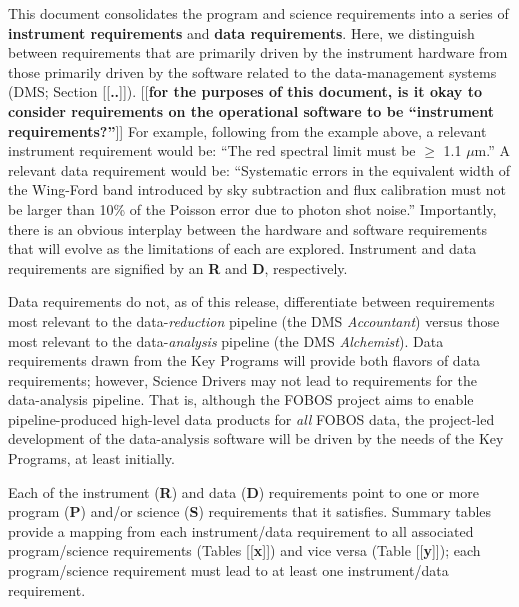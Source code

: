 \documentclass[11pt,a4paper,twoside,onecolumn,openany,final,oldfontcommands]{memoir}
\newcommand{\edit}[2][todo]{{\color{#1}[[{\bf #2}]]}}
\begin{document}
This document consolidates the program and science requirements into a series of {\bf instrument requirements} and {\bf data requirements}.  Here, we distinguish between requirements that are primarily driven by the instrument hardware from those primarily driven by the software related to the data-management systems (DMS; Section \edit{..}).  \edit{for the purposes of this document, is it okay to consider requirements on the operational software to be ``instrument requirements?''}  For example, following from the example above, a relevant instrument requirement would be: ``The red spectral limit must be $\geq$ 1.1 $\mu$m.''  A relevant data requirement would be: ``Systematic errors in the equivalent width of the Wing-Ford band introduced by sky subtraction and flux calibration must not be larger than 10\% of the Poisson error due to photon shot noise.''  Importantly, there is an obvious interplay between the hardware and software requirements that will evolve as the limitations of each are explored. Instrument and data requirements are signified by an {\bf R} and {\bf D}, respectively.

Data requirements do not, as of this release, differentiate between requirements most relevant to the data-{\it reduction} pipeline (the DMS {\it Accountant}) versus those most relevant to the data-{\it analysis} pipeline (the DMS {\it Alchemist}).  Data requirements drawn from the Key Programs will provide both flavors of data requirements; however, Science Drivers may not lead to requirements for the data-analysis pipeline.  That is, although the FOBOS project aims to enable pipeline-produced high-level data products for {\it all} FOBOS data, the project-led development of the data-analysis software will be driven by the needs of the Key Programs, at least initially.

Each of the instrument ({\bf R}) and data ({\bf D}) requirements point to one or more program ({\bf P}) and/or science ({\bf S}) requirements that it satisfies.  Summary tables provide a mapping from each instrument/data requirement to all associated program/science requirements (Tables \edit{x}) and vice versa (Table \edit{y}); each program/science requirement must lead to at least one instrument/data requirement.

\end{document}
